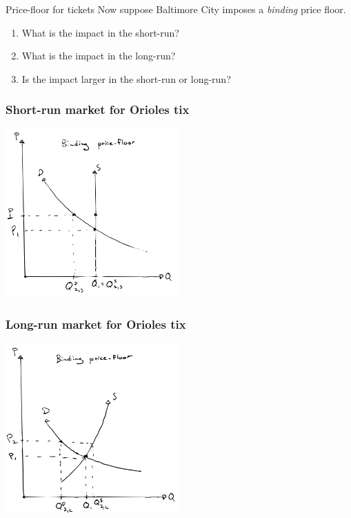 \documentclass[aspectratio=169]{beamer}
\begin{document}
\begin{frame}{Price-floor for tickets}
    Now suppose Baltimore City imposes a \textit{binding} price floor.

    \begin{enumerate}
        \item What is the impact in the short-run?
        \item What is the impact in the long-run?
        \item Is the impact larger in the short-run or long-run?
    \end{enumerate}
\end{frame}

\begin{frame}
    \frametitle{Short-run market for Orioles tix}
    \centering
    \includegraphics[width = 0.5\textwidth,keepaspectratio]{Orioles_floor_short.png}
\end{frame}

\begin{frame}
    \frametitle{Long-run market for Orioles tix}
    \centering
    \includegraphics[width = 0.5\textwidth,keepaspectratio]{Orioles_floor_long.png}
\end{frame}
\end{document}
